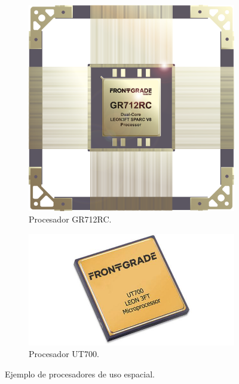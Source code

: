 
\vspace{1cm}

\begin{figure}[!htpb]
     \centering
     \begin{subfigure}[b]{0.49\textwidth}
         \centering
         \includegraphics[width=.85\textwidth]{./Figures/gr712rc}
         \caption{Procesador GR712RC.}
         \label{fig:procesadores1de2}
     \end{subfigure}
     \hfill
     \begin{subfigure}[b]{0.50\textwidth}
         \centering
         \includegraphics[width=1.28\textwidth]{./Figures/ut700}
         \caption{Procesador UT700.}
         \label{fig:procesadores2de2}
     \end{subfigure}
        \caption{Ejemplo de procesadores de uso espacial.\protect\footnotemark}
        \label{fig:procesadores}
\end{figure}

